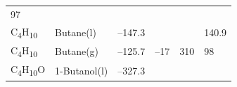 \documentclass[
]{book}
\theoremstyle{definition}
\theoremstyle{definition}
\theoremstyle{definition}
\theoremstyle{remark}
\begin{document}
\begin{longtable}[]{@{}llllll@{}}
\begin{minipage}[t]{0.14\columnwidth}
97\strut
\end{minipage}\tabularnewline
\begin{minipage}[t]{0.07\columnwidth}\raggedright
C\textsubscript{4}H\textsubscript{10}\strut
\end{minipage} & \begin{minipage}[t]{0.17\columnwidth}\raggedright
Butane(l)\strut
\end{minipage} & \begin{minipage}[t]{0.15\columnwidth}\raggedright
--147.3\strut
\end{minipage} & \begin{minipage}[t]{0.15\columnwidth}\raggedright
\strut
\end{minipage} & \begin{minipage}[t]{0.14\columnwidth}\raggedright
\strut
\end{minipage} & \begin{minipage}[t]{0.14\columnwidth}\raggedright
140.9\strut
\end{minipage}\tabularnewline
\begin{minipage}[t]{0.07\columnwidth}\raggedright
C\textsubscript{4}H\textsubscript{10}\strut
\end{minipage} & \begin{minipage}[t]{0.17\columnwidth}\raggedright
Butane(g)\strut
\end{minipage} & \begin{minipage}[t]{0.15\columnwidth}\raggedright
--125.7\strut
\end{minipage} & \begin{minipage}[t]{0.15\columnwidth}\raggedright
--17\strut
\end{minipage} & \begin{minipage}[t]{0.14\columnwidth}\raggedright
310\strut
\end{minipage} & \begin{minipage}[t]{0.14\columnwidth}\raggedright
98\strut
\end{minipage}\tabularnewline
\begin{minipage}[t]{0.07\columnwidth}\raggedright
C\textsubscript{4}H\textsubscript{10}O\strut
\end{minipage} & \begin{minipage}[t]{0.17\columnwidth}\raggedright
1-Butanol(l)\strut
\end{minipage} & \begin{minipage}[t]{0.15\columnwidth}\raggedright
--327.3\strut
\end{minipage} & \begin{minipage}[t]{0.15\columnwidth}\raggedright

\end{minipage}
\end{longtable}
\end{document}
